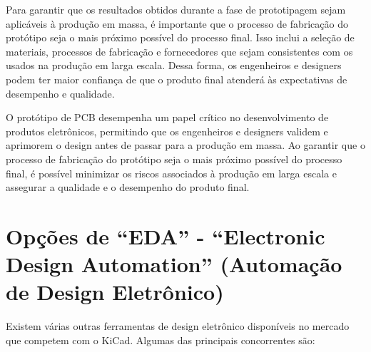 Para garantir que os resultados obtidos durante a fase de prototipagem sejam aplicáveis à produção em massa, é importante que o processo de fabricação do protótipo seja o mais próximo possível do processo final. Isso inclui a seleção de materiais, processos de fabricação e fornecedores que sejam consistentes com os usados na produção em larga escala. Dessa forma, os engenheiros e designers podem ter maior confiança de que o produto final atenderá às expectativas de desempenho e qualidade.

O protótipo de PCB desempenha um papel crítico no desenvolvimento de produtos eletrônicos, permitindo que os engenheiros e designers validem e aprimorem o design antes de passar para a produção em massa. Ao garantir que o processo de fabricação do protótipo seja o mais próximo possível do processo final, é possível minimizar os riscos associados à produção em larga escala e assegurar a qualidade e o desempenho do produto final.

\hypertarget{opuxe7uxf5es-de-eda---electronic-design-automation-automauxe7uxe3o-de-design-eletruxf4nico}{%
\chapter{Opções de ``EDA'' - ``Electronic Design Automation'' (Automação de Design Eletrônico)}\label{opuxe7uxf5es-de-eda---electronic-design-automation-automauxe7uxe3o-de-design-eletruxf4nico}}

Existem várias outras ferramentas de design eletrônico disponíveis no mercado que competem com o KiCad. Algumas das principais concorrentes são:

